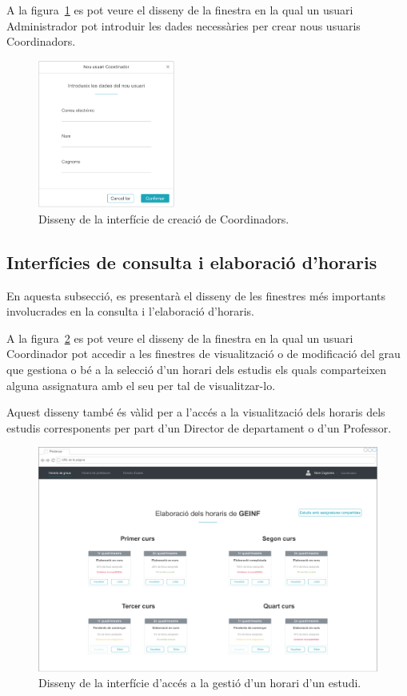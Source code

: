 \documentclass[a4paper,12pt]{ThesisStyle}
\begin{document}
A la figura~\ref{img:usuaris_crear} es pot veure el disseny de la finestra en la qual un usuari Administrador pot introduir les dades necessàries per crear nous usuaris Coordinadors.
\begin{figure}[H]
	\centering
	\includegraphics[width=0.4\textwidth]{assets/interfaces/usuaris/crear.pdf}
	\caption{\label{img:usuaris_crear}Disseny de la interfície de creació de Coordinadors.}
\end{figure}

\subsection{Interfícies de consulta i elaboració d'horaris}
\label{subsec:interficies_horaris}

En aquesta subsecció, es presentarà el disseny de les finestres més importants involucrades en la consulta i l'elaboració d'horaris.

A la figura~\ref{img:horaris_seleccioEstudi} es pot veure el disseny de la finestra en la qual un usuari Coordinador pot accedir a les finestres de visualització o de modificació del grau que gestiona o bé a la selecció d'un horari dels estudis els quals comparteixen alguna assignatura amb el seu per tal de visualitzar-lo.

Aquest disseny també és vàlid per a l'accés a la visualització dels horaris dels estudis corresponents per part d'un Director de departament o d'un Professor.

\begin{figure}[H]
	\centering
	\includegraphics[width=\textwidth]{assets/interfaces/horaris/seleccioEstudi.pdf}
	\caption{\label{img:horaris_seleccioEstudi}Disseny de la interfície d'accés a la gestió d'un horari d'un estudi.}
\end{figure}
\end{document}
